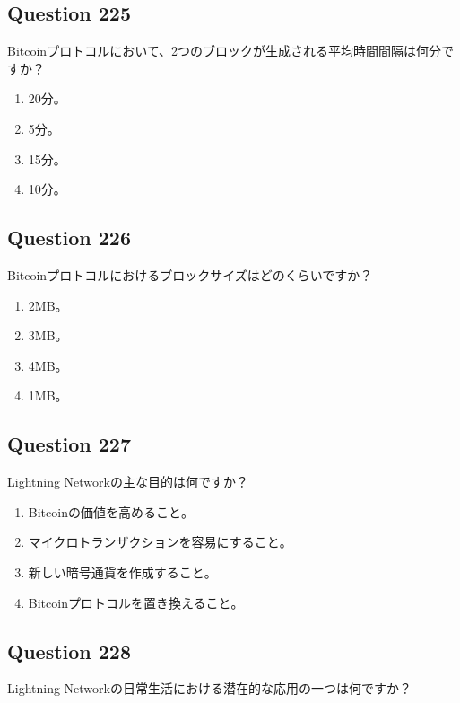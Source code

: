 \documentclass[12pt,a4paper]{article}
\begin{document}
\bigskip


\subsection*{Question 225}
Bitcoinプロトコルにおいて、2つのブロックが生成される平均時間間隔は何分ですか？

\begin{enumerate}[label=\Alph*., leftmargin=*]
\item 20分。
\item 5分。
\item 15分。
\item 10分。
\end{enumerate}

\bigskip


\subsection*{Question 226}
Bitcoinプロトコルにおけるブロックサイズはどのくらいですか？

\begin{enumerate}[label=\Alph*., leftmargin=*]
\item 2MB。
\item 3MB。
\item 4MB。
\item 1MB。
\end{enumerate}

\bigskip


\subsection*{Question 227}
Lightning Networkの主な目的は何ですか？

\begin{enumerate}[label=\Alph*., leftmargin=*]
\item Bitcoinの価値を高めること。
\item マイクロトランザクションを容易にすること。
\item 新しい暗号通貨を作成すること。
\item Bitcoinプロトコルを置き換えること。
\end{enumerate}

\bigskip


\subsection*{Question 228}
Lightning Networkの日常生活における潜在的な応用の一つは何ですか？
\end{document}
